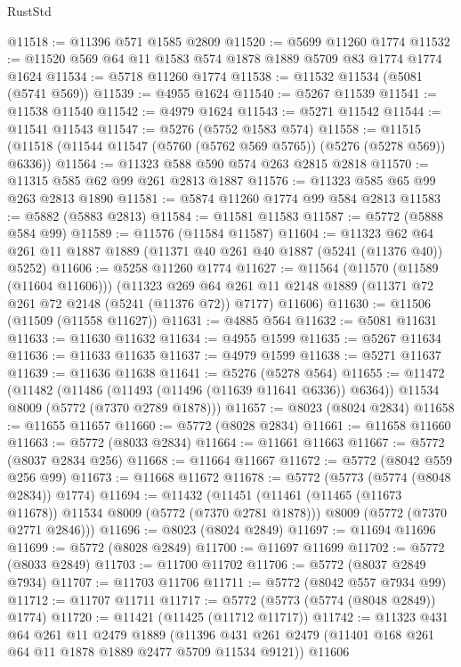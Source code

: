 \begin{lexlean}{RustStd}
\begin{coremodule}
@11518 := @11396 @571 @1585 @2809
@11520 := @5699 @11260 @1774
@11532 := @11520 @569 @64 @11 @1583 @574 @1878 @1889 @5709 @83 @1774 @1774 @1624
@11534 := @5718 @11260 @1774
@11538 := @11532 @11534 (@5081 (@5741 @569))
@11539 := @4955 @1624
@11540 := @5267 @11539
@11541 := @11538 @11540
@11542 := @4979 @1624
@11543 := @5271 @11542
@11544 := @11541 @11543
@11547 := @5276 (@5752 @1583 @574)
@11558 := @11515 (@11518 (@11544 @11547 (@5760 (@5762 @569 @5765)) (@5276 (@5278 @569)) @6336))
@11564 := @11323 @588 @590 @574 @263 @2815 @2818
@11570 := @11315 @585 @62 @99 @261 @2813 @1887
@11576 := @11323 @585 @65 @99 @263 @2813 @1890
@11581 := @5874 @11260 @1774 @99 @584 @2813
@11583 := @5882 (@5883 @2813)
@11584 := @11581 @11583
@11587 := @5772 (@5888 @584 @99)
@11589 := @11576 (@11584 @11587)
@11604 := @11323 @62 @64 @261 @11 @1887 @1889 (@11371 @40 @261 @40 @1887 (@5241 (@11376 @40)) @5252)
@11606 := @5258 @11260 @1774
@11627 := @11564
    (@11570 (@11589 (@11604 @11606)))
    (@11323
      @269
      @64
      @261
      @11
      @2148
      @1889
      (@11371 @72 @261 @72 @2148 (@5241 (@11376 @72)) @7177)
      @11606)
@11630 := @11506 (@11509 (@11558 @11627))
@11631 := @4885 @564
@11632 := @5081 @11631
@11633 := @11630 @11632
@11634 := @4955 @1599
@11635 := @5267 @11634
@11636 := @11633 @11635
@11637 := @4979 @1599
@11638 := @5271 @11637
@11639 := @11636 @11638
@11641 := @5276 (@5278 @564)
@11655 := @11472
    (@11482
      (@11486 (@11493 (@11496 (@11639 @11641 @6336)) @6364))
      @11534
      @8009
      (@5772 (@7370 @2789 @1878)))
@11657 := @8023 (@8024 @2834)
@11658 := @11655 @11657
@11660 := @5772 (@8028 @2834)
@11661 := @11658 @11660
@11663 := @5772 (@8033 @2834)
@11664 := @11661 @11663
@11667 := @5772 (@8037 @2834 @256)
@11668 := @11664 @11667
@11672 := @5772 (@8042 @559 @256 @99)
@11673 := @11668 @11672
@11678 := @5772 (@5773 (@5774 (@8048 @2834)) @1774)
@11694 := @11432
    (@11451
      (@11461 (@11465 (@11673 @11678)) @11534 @8009 (@5772 (@7370 @2781 @1878)))
      @8009
      (@5772 (@7370 @2771 @2846)))
@11696 := @8023 (@8024 @2849)
@11697 := @11694 @11696
@11699 := @5772 (@8028 @2849)
@11700 := @11697 @11699
@11702 := @5772 (@8033 @2849)
@11703 := @11700 @11702
@11706 := @5772 (@8037 @2849 @7934)
@11707 := @11703 @11706
@11711 := @5772 (@8042 @557 @7934 @99)
@11712 := @11707 @11711
@11717 := @5772 (@5773 (@5774 (@8048 @2849)) @1774)
@11720 := @11421 (@11425 (@11712 @11717))
@11742 := @11323
    @431
    @64
    @261
    @11
    @2479
    @1889
    (@11396 @431 @261 @2479 (@11401 @168 @261 @64 @11 @1878 @1889 @2477 @5709 @11534 @9121))
    @11606

\end{coremodule}
\end{lexlean}
